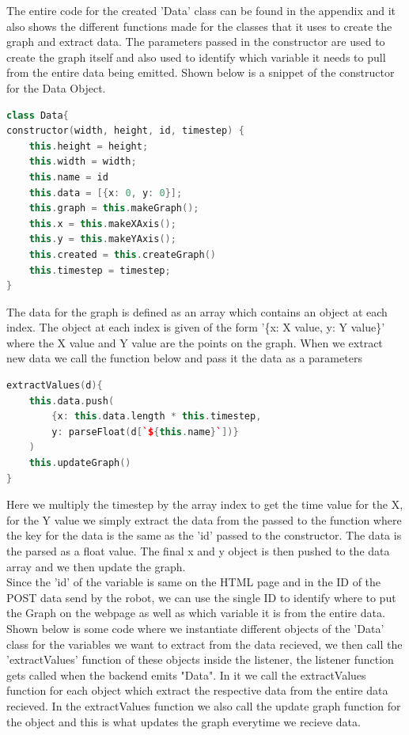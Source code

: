 \documentclass[conference]{IEEEtran}
\begin{document}
    The entire code for the created 'Data' class can be found in the appendix and it also shows the different
    functions made for the classes that it uses to create the graph and extract data. The parameters 
    passed in the constructor are used to create the graph itself and also used to identify which variable
    it needs to pull from the entire data being emitted. Shown below is a snippet of the constructor for the
    Data Object.
    
\begin{lstlisting}[language=C++, caption=Data Class Constructor]
class Data{
constructor(width, height, id, timestep) {
    this.height = height;
    this.width = width;
    this.name = id
    this.data = [{x: 0, y: 0}];
    this.graph = this.makeGraph();
    this.x = this.makeXAxis();
    this.y = this.makeYAxis();
    this.created = this.createGraph()
    this.timestep = timestep;
}\end{lstlisting}
    
    The data for the graph is defined as an array which contains an object at each index. The object at each
    index is given of the form '\{x: X value, y: Y value\}' where the X value and Y value are the points on the 
    graph. When we extract new data we call the function below and pass it the data as a parameters

\begin{lstlisting}[language=C++, caption=Extract Values Function]
extractValues(d){
    this.data.push(
        {x: this.data.length * this.timestep,
        y: parseFloat(d[`${this.name}`])}
    )
    this.updateGraph()
}\end{lstlisting}
    
    Here we multiply the timestep by the array index to get the time value for the X, for the Y value we
    simply extract the data from the passed to the function where the key for the data is the same as the 'id' passed
    to the constructor. The data is the parsed as a float value. The final x and y object is then pushed to the data array
    and we then update the graph.\\


    Since the 'id' of the variable is same on the
    HTML page and in the ID of the POST data send by the robot, we can use the single ID to identify where to put the Graph
    on the webpage as well as which variable it is from the entire data. Shown below is some code where
    we instantiate different objects of the 'Data' class for the variables we want to extract from the data recieved,
    we then call the 'extractValues' function of these objects inside the listener, the listener function gets called when
    the backend emits "Data". In it we call the extractValues function for each object which extract the respective data
    from the entire data recieved. In the extractValues function we also call the update graph function for the
    object and this is what updates the graph everytime we recieve data.
\end{document}
